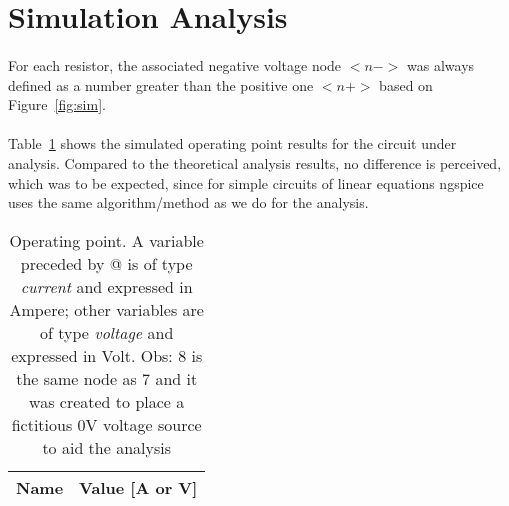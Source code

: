\section{Simulation Analysis}
\label{sec:simulation}

\paragraph{} For each resistor, the associated negative voltage node $<n->$ was always defined as a number greater than the positive one $<n+>$ based on Figure~\ref{fig:sim}.
\paragraph{} Table~\ref{tab:op} shows the simulated operating point results for the circuit under analysis. Compared to the theoretical analysis results, no difference is perceived, which was to be expected, since for simple circuits of linear equations ngspice uses the same algorithm/method as we do for the analysis.

\clearpage

\begin{table}[h]
  \centering
  \begin{tabular}{|l|r|}
    \hline    
    {\bf Name} & {\bf Value [A or V]} \\ \hline
    
  \end{tabular}
  \caption{Operating point. A variable preceded by @ is of type {\em current}
    and expressed in Ampere; other variables are of type {\it voltage} and expressed in Volt. Obs: 8 is the same node as 7 and it was created to place a fictitious 0V voltage source to aid the analysis}
  \label{tab:op}
\end{table}
